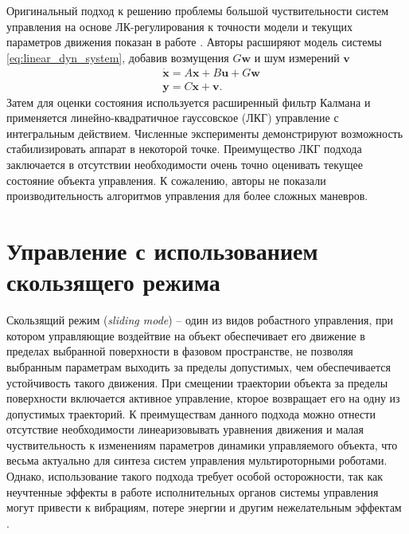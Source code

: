 Оригинальный подход к решению проблемы большой чуствительности систем управления на основе ЛК-регулирования к точности модели и текущих параметров движения показан в работе \cite{Minh01}. Авторы расширяют модель системы \eqref{eq:linear_dyn_system}, добавив возмущения $G \bm{w}$ и шум измерений $\bm{v}$
\begin{equation} \label{eq:linear_dyn_system_noisy}
\begin{aligned}
&\dot{\bm{x}} = A\bm{x} + B\bm{u} + G \bm{w}\\
&\bm{y} = C \bm{x} + \bm{v}.
\end{aligned}
\end{equation}
Затем для оценки состояния используется расширенный фильтр Калмана и применяется линейно-квадратичное гауссовское (ЛКГ) управление с интегральным действием. Численные эксперименты демонстрируют возможность стабилизировать аппарат в некоторой точке. Преимущество ЛКГ подхода заключается в отсутствии необходимости очень точно оценивать текущее состояние объекта управления. К сожалению, авторы не показали производительность алгоритмов управления для более сложных маневров.

\section{Управление с использованием скользящего режима}

Скользящий режим (\textit{sliding mode}) -- один из видов робастного управления, при котором управляющие воздейтвие на объект обеспечивает его движение в пределах выбранной поверхности в фазовом пространстве, не позволяя выбранным параметрам выходить за пределы допустимых, чем обеспечивается устойчивость такого движения.
При смещении траектории объекта за пределы поверхности включается активное управление, кторое возвращает его на одну из допустимых траекторий.
К преимуществам данного подхода можно отнести отсутствие необходимости линеаризовывать уравнения движения и малая чуствительность к изменениям параметров динамики управляемого объекта, что весьма актуально для синтеза систем управления мультироторными роботами.
Однако, использование такого подхода требует особой осторожности, так как неучтенные эффекты в работе исполнительных органов системы управления могут привести к вибрациям, потере энергии и другим нежелательным эффектам \cite{Utkin01}.

